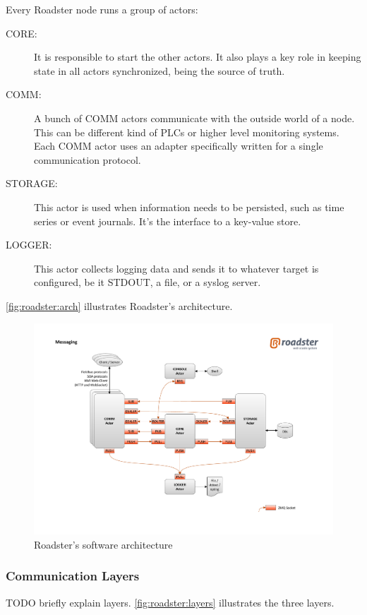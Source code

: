 Every Roadster node runs a group of actors:

\begin{description}
	\item [CORE:]
		It is responsible to start the other actors. It also plays a
		key role in keeping state in all actors synchronized, being the
		source of truth.

	\item [COMM:]
		A bunch of COMM actors communicate with the outside world of a
		node. This can be different kind of \glspl{PLC} or higher level
		monitoring systems. Each COMM actor uses an adapter
		specifically written for a single communication protocol.

	\item [STORAGE:]
		This actor is used when information needs to be persisted, such
		as time series or event journals. It's the interface to a
		key-value store.

	\item [LOGGER:]
		This actor collects logging data and sends it to whatever
		target is configured, be it STDOUT, a file, or a syslog server.
\end{description}

\autoref{fig:roadster:arch} illustrates Roadster's architecture.

\begin{figure}[!ht]
	\includegraphics[trim=4cm 2cm 3.5cm 2.8cm, clip=true, width=\textwidth]{img/roadster_arch.pdf}
	\caption{Roadster's software architecture}
	\label{fig:roadster:arch}
\end{figure}

\subsubsection{Communication Layers}
TODO briefly explain layers. \autoref{fig:roadster:layers} illustrates the three layers.

